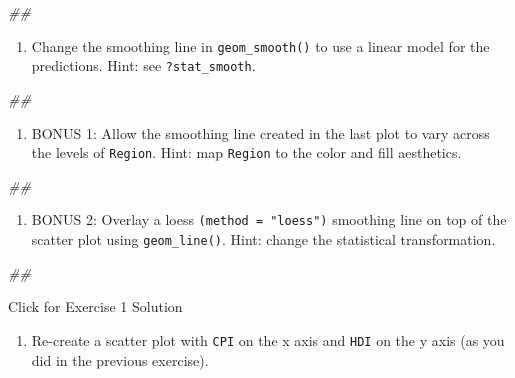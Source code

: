 \documentclass[
]{book}
\newenvironment{Shaded}{\begin{snugshade}}{\end{snugshade}}
\newcommand{\CommentTok}[1]{\textcolor[rgb]{0.56,0.35,0.01}{\textit{#1}}}
\providecommand{\tightlist}{%
  \setlength{\itemsep}{0pt}\setlength{\parskip}{0pt}}
\begin{document}
\begin{Shaded}
\begin{Highlighting}[]
\CommentTok{\#\# }
\end{Highlighting}
\end{Shaded}

\begin{enumerate}
\def\labelenumi{\arabic{enumi}.}
\setcounter{enumi}{3}
\tightlist
\item
  Change the smoothing line in \texttt{geom\_smooth()} to use a linear model for the predictions. Hint: see \texttt{?stat\_smooth}.
\end{enumerate}

\begin{Shaded}
\begin{Highlighting}[]
\CommentTok{\#\# }
\end{Highlighting}
\end{Shaded}

\begin{enumerate}
\def\labelenumi{\arabic{enumi}.}
\setcounter{enumi}{4}
\tightlist
\item
  BONUS 1: Allow the smoothing line created in the last plot to vary across the levels of \texttt{Region}. Hint: map \texttt{Region} to the color and fill aesthetics.
\end{enumerate}

\begin{Shaded}
\begin{Highlighting}[]
\CommentTok{\#\# }
\end{Highlighting}
\end{Shaded}

\begin{enumerate}
\def\labelenumi{\arabic{enumi}.}
\setcounter{enumi}{5}
\tightlist
\item
  BONUS 2: Overlay a loess \texttt{(method\ =\ "loess")} smoothing line on top of the scatter plot using \texttt{geom\_line()}. Hint: change the statistical transformation.
\end{enumerate}

\begin{Shaded}
\begin{Highlighting}[]
\CommentTok{\#\# }
\end{Highlighting}
\end{Shaded}

{Click for Exercise 1 Solution}

\begin{enumerate}
\def\labelenumi{\arabic{enumi}.}
\tightlist
\item
  Re-create a scatter plot with \texttt{CPI} on the x axis and \texttt{HDI} on the y axis (as you did in the previous exercise).
\end{enumerate}
\end{document}
